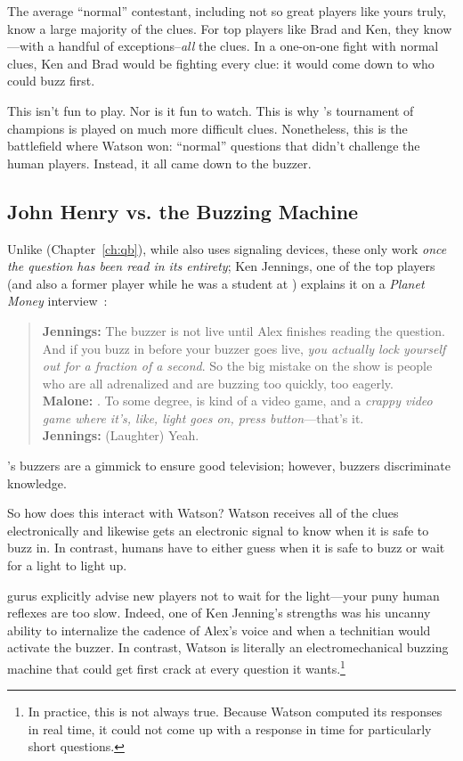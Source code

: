 The average ``normal'' \jeopardy{} contestant, including not so great
players like yours truly, know a large majority of the clues.
%
For top players like Brad and Ken, they know---with a handful of
exceptions--\emph{all} the clues.
%
In a one-on-one fight with normal clues, Ken and Brad would be
fighting every clue: it would come down to who could buzz first.

This isn't fun to play.
%
Nor is it fun to watch.
%
This is why \jeopardyp{}'s tournament of champions is played on much
more difficult clues.
%
Nonetheless, this is the battlefield where Watson won: ``normal''
questions that didn't challenge the human players.
%
Instead, it all came down to the buzzer.

\subsection{John Henry vs. the Buzzing Machine}

Unlike \qb{} (Chapter~\ref{ch:qb}), while \jeopardy{} also uses
signaling devices, these only work \emph{once the question has been
  read in its entirety}; Ken Jennings, one of the top \jeopardy{}
players (and also a former \qb{} player while he was a student at
) explains it on a \textit{Planet Money}
interview~\cite{malone-19}:
\begin{quote}
{\bf Jennings:} The buzzer is
    not live until Alex finishes reading the question. And if you buzz
    in before your buzzer goes live, \emph{you actually lock yourself out
    for a fraction of a second}. So the big mistake on the show is
    people who are all adrenalized and are buzzing too quickly, too
    eagerly. \\
{\bf Malone:} . To some degree, \jeopardy{} is kind of a video game, and a \emph{crappy video game where it's, like, light goes on, press button}---that's it. \\
{\bf Jennings:} (Laughter) Yeah. \\
\end{quote}
\jeopardy{}'s buzzers are a gimmick to ensure good television; however, \qb{} buzzers discriminate knowledge.

So how does this interact with Watson?
%
Watson receives all of the clues electronically and likewise gets an electronic signal to know when it is safe to buzz in.
%
In contrast, humans have to either guess when it is safe to buzz or wait for a light to light up.

\jeopardy{} gurus explicitly advise new players not to wait for the light---your puny human reflexes are too slow.
%
Indeed, one of Ken Jenning's strengths was his uncanny ability to
internalize the cadence of Alex's voice and when a technitian would
activate the buzzer.
%
In contrast, Watson is literally an electromechanical buzzing machine
that could get first crack at every question it wants.\footnote{In
practice, this is not always true.  Because Watson computed its
responses in real time, it could not come up with a response in time
for particularly short questions.}

